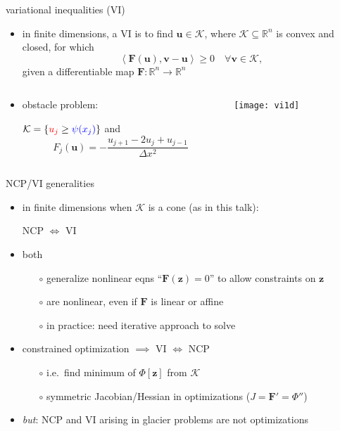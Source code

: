 \documentclass[xcolor={dvipsnames}]{beamer}
\newcommand\bu{\mathbf{u}}
\newcommand\bv{\mathbf{v}}
\newcommand\bz{\mathbf{z}}
\newcommand\bF{\mathbf{F}}
\newcommand\RR{\mathbb{R}}
\newcommand{\ip}[2]{\ensuremath{\left<#1,#2\right>}}
\begin{document}
\begin{frame}{variational inequalities (VI)}

\begin{itemize}
\item in finite dimensions, a VI is to find $\bu\in\mathcal{K}$, where $\mathcal{K}\subseteq \RR^n$ is convex and closed, for which
\begin{equation}
     \ip{\bF(\bu)}{\bv-\bu} \ge 0 \quad \forall \bv \in \mathcal{K},
\end{equation}
given a differentiable map $\bF:\RR^n \to \RR^n$
\end{itemize}

\begin{columns}
\begin{column}{0.4\textwidth}
\small
\begin{itemize}
\item obstacle problem:

$\mathcal{K} = \{{\color{red} u_j} \ge {\color{blue} \psi(x_j)}\}$ and
  $$F_j(\bu) = - \frac{u_{j+1} - 2 u_j + u_{j-1}}{\Delta x^2}$$
\end{itemize}
\end{column}
\begin{column}{0.6\textwidth}
\texttt{[image: vi1d]}
\end{column}
\end{columns}\end{frame}


\begin{frame}{NCP/VI generalities}

\begin{itemize}
\item in finite dimensions when $\mathcal{K}$ is a cone (as in this talk):
\begin{center}
\alert{NCP $\iff$ VI}
\end{center}
\item both 
  \begin{itemize}
  \item[$\circ$]  generalize nonlinear eqns ``$\bF(\bz)=0$'' to allow constraints on $\bz$
  \item[$\circ$]  are nonlinear, even if $\bF$ is linear or affine
  \item[$\circ$]  in practice: need iterative approach to solve
  \end{itemize}
\item constrained optimization $\implies$ VI $\iff$ NCP
  \begin{itemize}
  \item[$\circ$]  i.e.~find minimum of $\Phi[\bz]$ from $\mathcal{K}$
  \item[$\circ$]  symmetric Jacobian/Hessian in optimizations ($J = \bF' = \Phi''$)
  \end{itemize}
\item \emph{but}: NCP and VI arising in glacier problems are \alert{not} optimizations
\end{itemize}
\end{frame}
\end{document}
